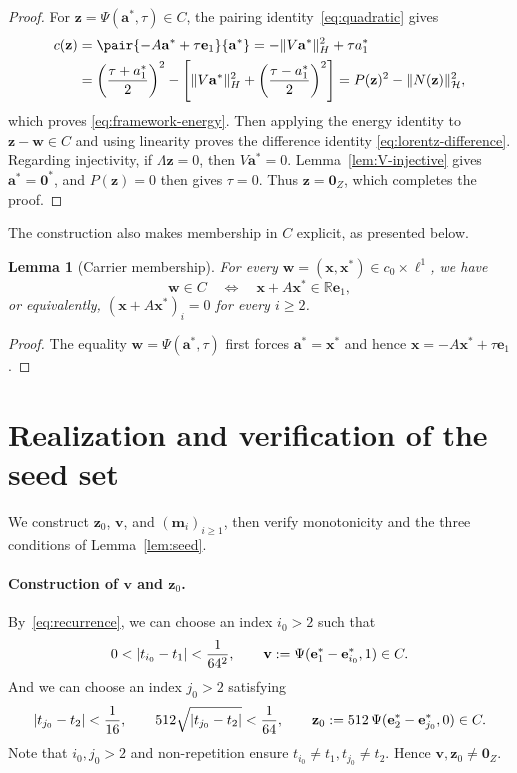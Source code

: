 \documentclass[11pt,a4paper]{article}
\theoremstyle{reportstyle}
\newtheorem{lemma}{Lemma}
\numberwithin{equation}{section}
\newcommand{\R}{\mathbb R}
\newcommand{\HH}{\mathcal H}
\newcommand{\bx}{\mathbf x}
\newcommand{\ba}{\mathbf a}
\newcommand{\be}{\mathbf e}
\newcommand{\bv}{\mathbf v}
\newcommand{\bz}{\mathbf z}
\newcommand{\bm}{\mathbf m}
\newcommand{\bw}{\mathbf w}
\newcommand{\bzero}{\mathbf 0}
\DeclarePairedDelimiter{\norm}{\lVert}{\rVert}
\DeclarePairedDelimiter{\abs}{\lvert}{\rvert}
\begin{document}
	\begin{proof}
		For $\bz=\Psi(\ba^*,\tau)\in C$, the pairing identity~\eqref{eq:quadratic} gives
		\begin{align*}
			c(\bz) &=\pair{-A\ba^*+\tau\be_1}{\ba^*} =-\norm{V\ba^*}_H^2+\tau a_1^*\\
			&=\left(\frac{\tau+a_1^*}{2}\right)^2 -\left[\norm{V\ba^*}_H^2 +\left(\frac{\tau-a_1^*}{2}\right)^2\right] = P(\bz)^2-\norm{N(\bz)}_{\HH}^2,
		\end{align*}
		which proves \eqref{eq:framework-energy}. Then applying the energy identity to $\bz-\bw\in C$ and
		using linearity proves the difference identity \eqref{eq:lorentz-difference}. Regarding injectivity, if
		$\Lambda \bz=0$, then $V\ba^*=0$. Lemma~\ref{lem:V-injective} gives
		$\ba^*=\bzero^*$, and $P(\bz)=0$ then gives $\tau=0$. Thus $\bz=\bzero_Z$, which completes the proof.
	\end{proof}

	The construction also makes membership in $C$ explicit, as presented below.

	\begin{lemma}[Carrier membership]
		\label{lem:membership}
		For every $\bw=(\bx,\bx^*)\in c_0\times\ell^1$, we have
		\begin{equation*}
			\bw\in C \quad\Longleftrightarrow\quad \bx+A\bx^*\in\R\be_1,
		\end{equation*}
		or equivalently, $(\bx+A\bx^*)_i=0$ for every $i\ge2$.
	\end{lemma}

	\begin{proof}
		The equality $\bw=\Psi(\ba^*,\tau)$ first forces $\ba^*=\bx^*$ and hence $\bx=-A\bx^*+\tau\be_1$.
	\end{proof}

	\section{Realization and verification of the seed set}
	\label{sec:seed}
	We construct $\bz_0$, $\bv$, and $(\bm_i)_{i\ge1}$, then verify
	monotonicity and the three conditions of Lemma~\ref{lem:seed}.

	\paragraph{Construction of  $\bv$ and $\bz_0$.}
	By~\eqref{eq:recurrence}, we can choose an index $i_0>2$ such that
	\begin{equation}
		0<\abs{t_{i_0}-t_1}<\frac1{64^2}, \qquad \bv:=\Psi(\be_1^*-\be_{i_0}^*,1)\in C.
		\label{eq:v-choice}
	\end{equation}
	And we can choose an index $j_0>2$ satisfying
	\begin{equation*}
		\abs{t_{j_0}-t_2}<\frac1{16}, \qquad 512\sqrt{\abs{t_{j_0}-t_2}}<\frac1{64}, \qquad \bz_0:=512\,\Psi(\be_2^*-\be_{j_0}^*,0)\in C.
	\end{equation*}
	Note that $i_0,j_0>2$ and non-repetition ensure $t_{i_0}\neq t_1,t_{j_0}\ne t_2$. Hence $\bv,\bz_0\neq \bzero_Z$.
\end{document}

